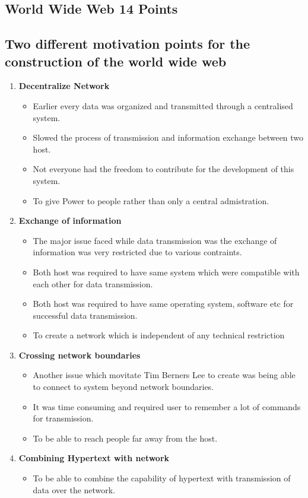 \documentclass{resources/WeSTassignment}
\begin{document}
\begin{enumerate}
\section{World Wide Web \hfill{14 Points}}
\subsection{Two different motivation points for the construction of the world wide web}
\begin{enumerate}
    \item \textbf{Decentralize Network}
	\begin{itemize}
    		\item Earlier every data was organized and transmitted through a centralised system.
		\item Slowed the process of transmission and information exchange between two host.
		\item Not everyone had the freedom to contribute for the development of this system.
		\item To give Power to people rather than only a central admistration.
	\end{itemize}
    \item \textbf{Exchange of information}
	\begin{itemize}
    		\item The major issue faced while data transmission was the exchange of information was very restricted due to various contraints.
		\item Both host was required to have same system which were compatible with each other for data transmission.
		\item Both host was required to have same operating system, software etc for successful data transmission.
		\item To create a network which is independent of any technical restriction
	\end{itemize}
    \item \textbf{Crossing network boundaries}
	\begin{itemize}
    		\item Another issue which movitate Tim Berners Lee to create was being able to connect to system beyond network boundaries.
		\item It was time consuming and required user to remember a lot of commands for transmission.
		\item To be able to reach people far away from the host.
	\end{itemize}
    \item \textbf{Combining Hypertext with network}
	\begin{itemize}
    		\item To be able to combine the capability of hypertext with transmission of data over the network.
	\end{itemize}
\end{enumerate}


\end{enumerate}
\end{document}
